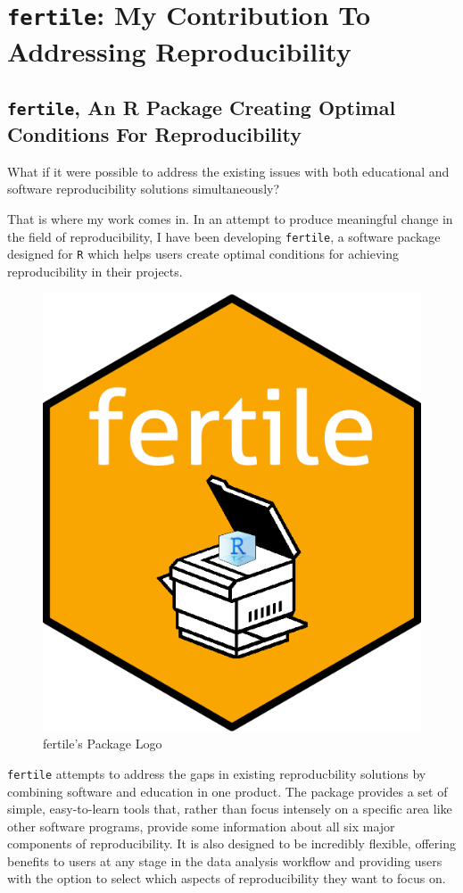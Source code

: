 \documentclass[12pt,twoside]{reedthesis}
\begin{document}
\hypertarget{my-solution}{%
\chapter{\texorpdfstring{\texttt{fertile}: My Contribution To Addressing Reproducibility}{fertile: My Contribution To Addressing Reproducibility}}\label{my-solution}}

\hypertarget{fertile-an-r-package-creating-optimal-conditions-for-reproducibility}{%
\section{\texorpdfstring{\texttt{fertile}, An R Package Creating Optimal Conditions For Reproducibility}{fertile, An R Package Creating Optimal Conditions For Reproducibility}}\label{fertile-an-r-package-creating-optimal-conditions-for-reproducibility}}

What if it were possible to address the existing issues with both educational and software reproducibility solutions simultaneously?

That is where my work comes in. In an attempt to produce meaningful change in the field of reproducibility, I have been developing \texttt{fertile}, a software package designed for \texttt{R} which helps users create optimal conditions for achieving reproducibility in their projects.
\begin{figure}

{\centering \includegraphics[width=0.3\linewidth]{figure/fertile-hex} 

}

\caption{fertile's Package Logo}\label{fig:unnamed-chunk-8}
\end{figure}
\texttt{fertile} attempts to address the gaps in existing reproducbility solutions by combining software and education in one product. The package provides a set of simple, easy-to-learn tools that, rather than focus intensely on a specific area like other software programs, provide some information about all six major components of reproducibility. It is also designed to be incredibly flexible, offering benefits to users at any stage in the data analysis workflow and providing users with the option to select which aspects of reproducibility they want to focus on.
\end{document}

